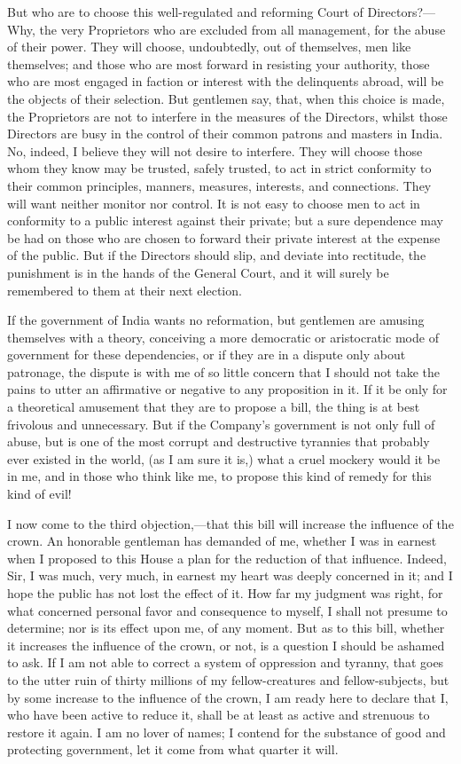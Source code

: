 But who are to choose this well-regulated and reforming Court of Directors?—Why, the very Proprietors who are excluded from all management, for the abuse of their power. They will choose, undoubtedly, out of themselves, men like themselves; and those who are most forward in resisting your authority, those who are most engaged in faction or interest with the delinquents abroad, will be the objects of their selection. But gentlemen say, that, when this choice is made, the Proprietors are not to interfere in the measures of the Directors, whilst those Directors are busy in the control of their common patrons and masters in India. No, indeed, I believe they will not desire to interfere. They will choose those whom they know may be trusted, safely trusted, to act in strict conformity to their common principles, manners, measures, interests, and connections. They will want neither monitor nor control. It is not easy to choose men to act in conformity to a public interest against their private; but a sure dependence may be had on those who are chosen to forward their private interest at the expense of the public. But if the Directors should slip, and deviate into rectitude, the punishment is in the hands of the General Court, and it will surely be remembered to them at their next election.

If the government of India wants no reformation, but gentlemen are amusing themselves with a theory, conceiving a more democratic or aristocratic mode of government for these dependencies, or if they are in a dispute only about patronage, the dispute is with me of so little concern that I should not take the pains to utter an affirmative or negative to any proposition in it. If it be only for a theoretical amusement that they are to propose a bill, the thing is at best frivolous and unnecessary. But if the Company's government is not only full of abuse, but is one of the most corrupt and destructive tyrannies that probably ever existed in the world, (as I am sure it is,) what a cruel mockery would it be in me, and in those who think like me, to propose this kind of remedy for this kind of evil!

I now come to the third objection,—that this bill will increase the influence of the crown. An honorable gentleman has demanded of me, whether I was in earnest when I proposed to this House a plan for the reduction of that influence. Indeed, Sir, I was much, very much, in earnest my heart was deeply concerned in it; and I hope the public has not lost the effect of it. How far my judgment was right, for what concerned personal favor and consequence to myself, I shall not presume to determine; nor is its effect upon me, of any moment. But as to this bill, whether it increases the influence of the crown, or not, is a question I should be ashamed to ask. If I am not able to correct a system of oppression and tyranny, that goes to the utter ruin of thirty millions of my fellow-creatures and fellow-subjects, but by some increase to the influence of the crown, I am ready here to declare that I, who have been active to reduce it, shall be at least as active and strenuous to restore it again. I am no lover of names; I contend for the substance of good and protecting government, let it come from what quarter it will.

